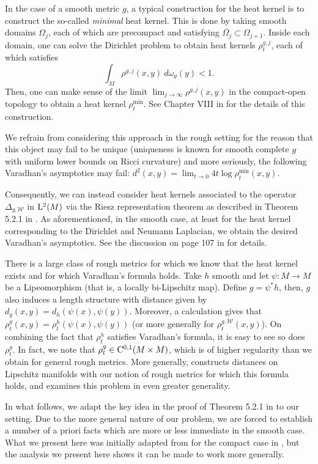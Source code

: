 \documentclass[AMS,STIX1COL]{WileyNJD-v2}
\numberwithin{equation}{section}
\renewcommand{\~}{\tilde}
\renewcommand{\-}{\bar}
\newcommand{\8}{\infty}
\newcommand{\cW}{\mathcal{W}}
\newcommand{\close}[1]{\overline{#1}}		%
\newcommand{\pullb}[1]{{#1}^\ast}			%
\newcommand{\Lp}[2][{}]{{\rm L}^{#2}_{\rm #1}}		%
\newcommand{\Ck}[2][{}]{{\rm C}^{#2}_{\rm #1}}		%
\newcommand{\hk}{\rho}
\begin{document}
In the case of a smooth metric $g$, a typical construction for
the heat kernel is to construct the so-called \emph{minimal} heat kernel.
This is done by taking smooth domains $\Omega_j$, 
each of which are precompact and satisfying $\close{\Omega_j} \subset \Omega_{j+1}$. 
Inside each domain, one can solve the Dirichlet problem
to obtain heat kernels $\hk^{g,j}_{t}$, each of which
satisfies 
$$ \int_{M} \hk^{g,j}(x,y)\ d\omega_g(y) < 1.$$
Then, one can make sense of the limit $\lim_{j \to \infty} \hk^{g,j}(x,y)$
in the compact-open topology to obtain a heat kernel $\hk^{\min}_t$.
See Chapter VIII in \cite{Chavel} for the details
of this construction.

We refrain from considering this approach in the rough setting 
for the reason that this object may fail to be unique (uniqueness
is known for smooth complete $g$ with 
uniform lower bounds on Ricci curvature) and more seriously, the following
Varadhan's asymptotics may fail: 
$d^2(x,y) = \lim_{t \to 0} 4t \log \hk^{\min}_t(x,y)$.

Consequently, we can instead consider heat kernels
associated to the operator $\Delta_{g,\cW}$ in $\Lp{2}(M)$
via the Riesz representation theorem as described in Theorem 
5.2.1 in \cite{Davies}. As aforementioned, in the smooth case,
at least for the heat kernel corresponding to the 
Dirichlet and Neumann Laplacian, we obtain the desired  Varadhan's
asymptotics. See the discussion on page 107 in \cite{ERS} for details.

There is a large class of rough metrics
for which we know that the heat kernel exists
and for which Varadhan's formula holds. 
Take $h$ smooth and let $\psi:M \to M$
be a Lipeomorphism (that is, a locally bi-Lipschitz map).
Define $g = \pullb{\psi}h$, then, $g$ 
also induces a length structure with 
distance given by $d_g(x,y) = d_h(\psi(x), \psi(y))$.
Moreover, a calculation gives
that $\hk^{g}_t(x,y) = \hk^{h}_t(\psi(x), \psi(y))$
(or more generally for $\hk^{g,\cW}_t(x,y)$). 
On combining the fact that $\hk^h_t$ satisfies
Varadhan's formula, it is easy to see
so does $\hk^{g}_t$. In fact, we 
note that $\hk^g_t \in \Ck{0,1}(M \times M)$,
which is of higher regularity than we
obtain for general rough metrics.
More generally, \cite{Norris} constructs
distances on Lipschitz manifolds with our
notion of rough metrics for which this 
formula holds, and \cite{ERS} examines
this problem in even greater generality.

In what follows, we adapt the key idea in 
the proof of Theorem 5.2.1 in \cite{Davies}
to our setting. Due to the more general 
nature of our problem, we are forced to 
establish a number of a priori facts which 
are more or less immediate in the smooth case.
What we present here was initially adapted from \cite{SC} 
for the compact case in \cite{BCont}, but 
the analysis we present here shows it can be made to work more generally. 
\end{document}
